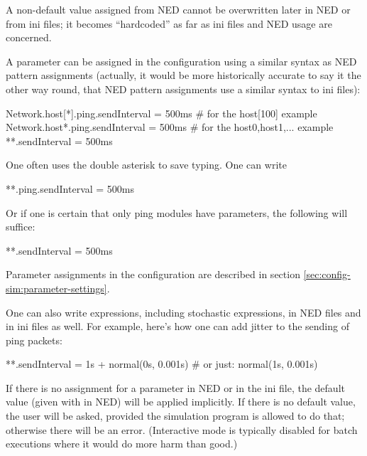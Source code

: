 \begin{important}
    A non-default value assigned from NED cannot be overwritten later in
    NED or from ini files; it becomes ``hardcoded'' as far as ini files
    and NED usage are concerned.
\end{important}

A parameter can be assigned in the configuration using a similar syntax as
NED pattern assignments (actually, it would be more historically accurate
to say it the other way round, that NED pattern assignments use a similar
syntax to ini files):


\begin{inifile}
Network.host[*].ping.sendInterval = 500ms  # for the host[100] example
Network.host*.ping.sendInterval = 500ms    # for the host0,host1,... example
**.sendInterval = 500ms
\end{inifile}

One often uses the double asterisk to save typing. One can write

\begin{inifile}
**.ping.sendInterval = 500ms
\end{inifile}

Or if one is certain that only ping modules have  parameters,
the following will suffice:

\begin{inifile}
**.sendInterval = 500ms
\end{inifile}

Parameter assignments in the configuration are described in section
\ref{sec:config-sim:parameter-settings}.

One can also write expressions, including stochastic expressions, in
NED files and in ini files as well. For example, here's how one can
add jitter to the sending of ping packets:

\begin{inifile}
**.sendInterval = 1s + normal(0s, 0.001s)  # or just: normal(1s, 0.001s)
\end{inifile}

If there is no assignment for a parameter in NED or in the ini file, the
default value (given with  in NED) will be applied
implicitly. If there is no default value, the user will be asked, provided
the simulation program is allowed to do that; otherwise there will be an
error. (Interactive mode is typically disabled for batch executions where
it would do more harm than good.)

